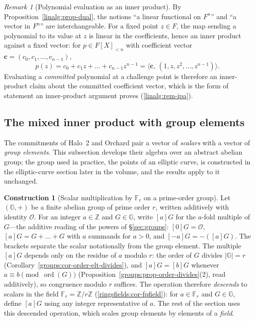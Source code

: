 \documentclass[11pt,a4paper]{article}
\theoremstyle{definition}
\newtheorem{construction}[theorem]{Construction}
\theoremstyle{remark}
\newtheorem{remark}[theorem]{Remark}
\newcommand{\Z}{\ensuremath{\mathbb{Z}}}
\newcommand{\G}{\ensuremath{\mathbb{G}}}
\newcommand{\ip}[2]{\langle #1,\, #2 \rangle}
\DeclareMathOperator{\ord}{ord}
\providecommand{\abs}[1]{\lvert #1 \rvert}
\newcommand{\Fr}{\ensuremath{\mathbb{F}_{r}}}
\begin{document}
\begin{remark}[Polynomial evaluation as an inner product]\label{linalg:rem-riesz}
By Proposition~\ref{linalg:prop-dual}, the notions ``a linear
functional on \(F^n\)'' and ``a vector in \(F^n\)'' are interchangeable.
For a fixed point \(z \in F\), the map sending a polynomial to its value
at \(z\) is linear in the coefficients, hence an inner product against a
fixed vector: for \(p \in F[X]_{<n}\) with coefficient vector
\(\mathbf c = (c_0, c_1, \dots, c_{n-1})\),
\[
p(z) = c_0 + c_1 z + \dots + c_{n-1} z^{n-1}
= \ip{\mathbf c}{(1, z, z^2, \dots, z^{n-1})}.
\]
Evaluating a \emph{committed} polynomial at a challenge point is
therefore an inner-product claim about the committed coefficient
vector, which is the form of statement an inner-product argument proves
(\cref{linalg:rem-ipa}).
\end{remark}

\subsection{The mixed inner product with group elements}
\label{linalg:subsec-mixed}

The commitments of Halo~2 and Orchard pair a vector of \emph{scalars}
with a vector of \emph{group elements}. This subsection develops their
algebra over an abstract abelian group; the group used in practice, the
points of an elliptic curve, is constructed in the elliptic-curve section
later in the volume, and the results apply to it unchanged.

\begin{construction}[Scalar multiplication by \(\Fr\) on a prime-order
group]\label{linalg:cons-scalarmult}
Let \((\G, +)\) be a finite abelian group of prime order \(r\), written
additively with identity \(\mathcal O\). For an integer \(a \in \Z\) and
\(G \in \G\), write \([a]G\) for the \(a\)-fold multiple of \(G\)---the
additive reading of the powers of \S\ref{sec:groups}: \([0]G = \mathcal
O\), \([a]G = G + \dots + G\) with \(a\) summands for \(a > 0\), and
\([-a]G = -([a]G)\). The brackets separate the scalar notationally from
the group element. The multiple \([a]G\) depends only on the
residue of \(a\) modulo \(r\): the order of \(G\) divides
\(\abs{\G} = r\) (Corollary~\ref{groups:cor-order-elt-divides}), and
\([a]G = [b]G\) whenever \(a \equiv b \pmod{\ord(G)}\)
(Proposition~\ref{groups:prop-order-divides}(2), read additively), so
congruence modulo \(r\) suffices. The operation therefore
\emph{descends} to scalars in the field \(\Fr = \Z/r\Z\)
(\cref{ringsfields:cor-fpfield}): for \(a \in \Fr\) and \(G \in \G\),
define \([a]G\) using any integer representative of \(a\). The rest of
the section uses this descended operation, which scales group elements
by elements of a \emph{field}.
\end{construction}
\end{document}
